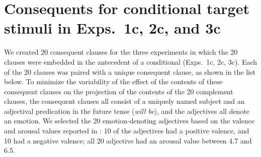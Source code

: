 \documentclass[11pt,fleqn]{article}
\newcommand{\6}{\mbox{$[\hspace*{-.6mm}[$}}
\newcommand{\9}{\mbox{$]\hspace*{-.6mm}]$}}
\begin{document}
\section{Consequents for conditional target stimuli in Exps.~1c, 2c, and 3c}\label{a-consequents}

  We created 20 consequent clauses for the three experiments in which the 20 clauses were embedded in the antecedent of a conditional (Exps.~1c, 2c, 3c). Each of the 20 clauses was paired with a unique consequent clause, as shown in the list below. To minimize the variability of the effect of the contents of these consequent clauses on the projection of the contents of the 20 complement clauses, the consequent clauses all consist of a uniquely named subject and an adjectival predication in the future tense ({\em will be}), and the adjectives all denote an emotion. We selected the 20 emotion-denoting adjectives based on the valence and arousal values reported in \citealt{warriner-etal2013}: 10 of the adjectives had a positive valence, and 10 had a negative valence; all 20 adjective had an arousal value between 4.7 and 6.5. 
\end{document}
